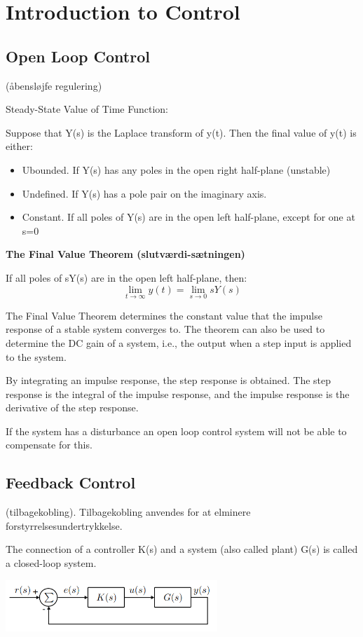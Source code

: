 \section{Introduction to Control}

\subsection{Open Loop Control}
(åbensløjfe regulering)

Steady-State Value of Time Function:

Suppose that Y(s) is the Laplace transform of y(t). Then the final value of y(t) is either:
\begin{itemize}
	\item{Ubounded. If Y(s) has any poles in the open right half-plane (unstable)}
	\item{Undefined. If Y(s) has a pole pair on the imaginary axis.}
	\item{Constant. If all poles of Y(s) are in the open left half-plane, except for one at s=0}
\end{itemize}

\textbf{The Final Value Theorem (slutværdi-sætningen)}

If all poles of sY(s) are in the open left half-plane, then:
$$\lim_{t \to \infty} y(t) = \lim_{s \to 0} sY(s)$$

The Final Value Theorem determines the constant value that the impulse response of a stable system converges to.
The theorem can also be used to determine the DC gain of a system, i.e., the output when a step input is applied to the system.

By integrating an impulse response, the step response is obtained. The step response is the integral of the impulse response,
and the impulse response is the derivative of the step response.

If the system has a disturbance an open loop control system will not be able to compensate for this.

\subsection{Feedback Control}
(tilbagekobling). Tilbagekobling anvendes for at elminere forstyrrelsesundertrykkelse.

The connection of a controller K(s) and a system (also called plant) G(s) is called a closed-loop system.
\begin{center}
	\includegraphics[width=0.6\textwidth]{Images/feedbackControl.png}
\end{center}

